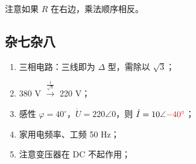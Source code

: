 \documentclass[a4paper]{article}  %
\theoremstyle{MyLineTheoremStyle} %
\theoremstyle{MyBlockTheoremStyle} %
\theoremstyle{MySubsubsectionStyle} %
\begin{document}
\begin{multicols*}{4}
注意如果 $R$ 在右边，乘法顺序相反。

\subsection{杂七杂八}
\begin{enumerate}
    \item 三相电路：三线即为 $\Delta$ 型，需除以 $\sqrt{3}$；
\item 380 V $\overset{\frac{1}{\sqrt{3}}}{\longrightarrow}$ 220 V；
\item 感性 $\varphi = 40^\circ $，$\dot{U} = 220 \angle 0$，则 $\dot{I} = 10 \angle {\color{red} -40^\circ}$；
\item 家用电频率、工频 50 Hz；
\item {\color{red} 注意变压器在 DC 不起作用}；
\end{enumerate}

\end{multicols*}  
\end{document}
